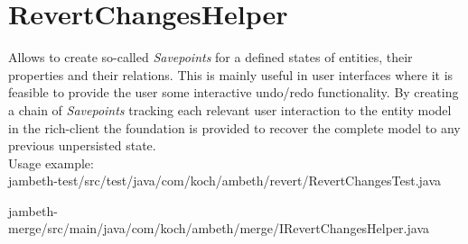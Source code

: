 \section{RevertChangesHelper}
\label{feature:RevertChangesHelper}
\ClearAPI
Allows to create so-called \textit{Savepoints} for a defined states of entities, their properties and their relations. This is mainly useful in user interfaces where it is feasible to provide the user some interactive undo/redo functionality. By creating a chain of \textit{Savepoints} tracking each relevant user interaction to the entity model in the rich-client the foundation is provided to recover the complete model to any previous unpersisted state.\\ Usage example:\\

{jambeth-test/src/test/java/com/koch/ambeth/revert/RevertChangesTest.java}

{jambeth-merge/src/main/java/com/koch/ambeth/merge/IRevertChangesHelper.java}


